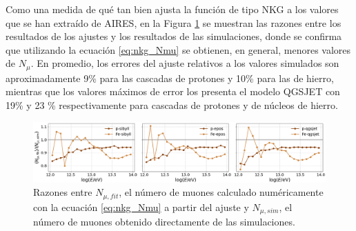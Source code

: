 \documentclass[12pt,letterpaper]{report}
\begin{document}
Como una medida de qu\'e tan bien ajusta la funci\'on de tipo NKG a los valores que se han extra\'ido de AIRES, en la Figura \ref{fig:munumbers_ratios} se muestran las razones entre los resultados de los ajustes y los resultados de las simulaciones, donde se confirma que utilizando la ecuaci\'on \ref{eq:nkg_Nmu} se obtienen, en general, menores valores de $N_{\mu}$. En promedio, los errores del ajuste relativos a los valores simulados son aproximadamente 9\% para las cascadas de protones y 10\% para las de hierro, mientras que los valores m\'aximos de error los presenta el modelo QGSJET con 19\% y 23 \%  respectivamente para cascadas de protones y de n\'ucleos de hierro.
	
	\begin{figure} 
	\includegraphics[width=\textwidth]{Figuras/munumbers_ratios}
	\caption{Razones entre $N_{\mu,fit}$, el n\'umero de muones  calculado num\'ericamente con la ecuaci\'on \ref{eq:nkg_Nmu} a partir del ajuste y $N_{\mu,sim}$, el n\'umero de muones obtenido directamente de las simulaciones.}
	\label{fig:munumbers_ratios}
	\end{figure}
	


	
\singlespacing

\printbibliography[title=Referencias,heading=bibintoc]
\end{document}
